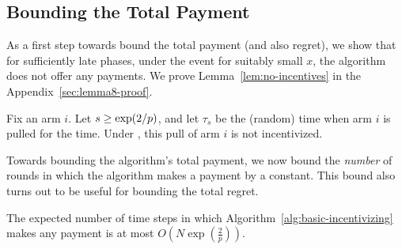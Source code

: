\subsection{Bounding the Total Payment}

As a first step towards bound the total payment (and also regret),
we show that for sufficiently late phases,
under the event  for suitably small $x$,
the algorithm does not offer any payments. We prove Lemma~\ref{lem:no-incentives} in the Appendix~\ref{sec:lemma8-proof}.

\begin{lemma} \label{lem:no-incentives}
Fix an arm $i$.
Let $s \geq \exp(2/p)$, and let $\tau_s$ be the (random)
time when arm $i$ is pulled for the  time.
Under ,
this pull of arm $i$ is not incentivized.
\end{lemma}

Towards bounding the algorithm's total payment, we now bound the
\emph{number} of rounds in which the algorithm makes a payment by a
constant.
This bound also turns out to be useful for bounding the total regret.

\begin{lemma} \label{lem:numP}
The expected number of time steps in which
Algorithm~\ref{alg:basic-incentivizing}
makes any payment is at most $O\left( N\exp\left(\frac{2}{p}\right) \right)$.
\end{lemma}

